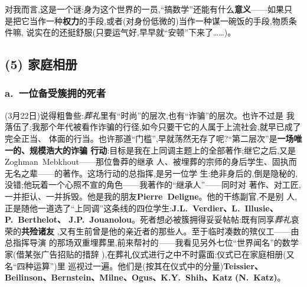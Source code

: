 \pmark{}对我而言,这是一个谜:身为这个世界的一员,“搞数学”还能有什么\textbf{意义}——如果只
是把它当作一种\textbf{权力}的手段,或者(对身份低微的)当作一种谋一碗饭的手段,物质条件嘛,
说实在的还挺舒服(只要运气好,早早就“安顿”下来了……)。

\subsection{(5) 家庭相册}   %


\subsubsection*{a.\ 一位备受簇拥的死者}

\pmark (3月22日)说得粗鲁些:\emph{葬礼}里有“时尚”的层次,也有“诈骗”的层次。也许不过是
我落伍了;我那个年代被看作诈骗的行径,如今只要干它的人属于上流社会,就早已成了完全正当、
体面的行当。也许那道“门槛”,早就荡然无存了呢?“第二层次”是\textbf{一场唯一的、规模浩大的诈骗
行动}:目标是我在上同调主题上的全部著作;继它之后,又是Zoghman~Mebkhout——那位鲁莽的继承
人、被埋葬的宗师的身后学生、固执而无名之辈——的著作。这场行动的总指挥,是另一位学
生:绝非身后的,倒是隐秘的,没错;他玩着一个心照不宣的角色——我著作的“继承人”——同时对
著作、对工匠,一并拒认、一并拆毁。他是我的朋友\textbf{Pierre~Deligne}。他的干练副官,不是别
人,正是随他一道选了“上同调”这条线的四位学生:\textbf{J.L.~Verdier、L.~Illusie、P.~Berthelot、
J.P.~Jouanolou}。死者想必被簇拥得妥妥帖帖:既有同享\emph{葬礼}哀荣的\textbf{共殓诸友}
,又有生前曾是他的亲近者的那些人。至于临时凑数的殡仪工——由总指挥导演
的那场双重埋葬里,前来帮衬的——我看见另外七位“世界闻名”的数学家(借某张广告招贴的\dmark{}措辞
),在葬礼仪式进行之中不时露面;仪式已在家庭相册(又名“四种运算”)里
巡视过一遍。他们是(按其在仪式中的分量)\textbf{Teissier、Beilinson、Bernstein、Milne、Ogus、K.Y.~Shih、Katz}
\textbf{(N.~Katz)}。


